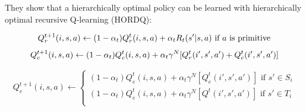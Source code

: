 They show that a hierarchically optimal policy can be learned with hierarchically optimal recursive Q-learning (HORDQ):

\begin{equation}
    Q_r^{t+1}(i, s, a) \leftarrow
    (1 - \alpha_t)Q_r^t(i, s, a) + \alpha_t R_t(s'| s, a)   \mbox{ if $a$ is primitive} \\
\end{equation}
\begin{equation}
    Q_c^{t+1}(i, s, a) \leftarrow
    (1 - \alpha_t)Q_c^t(i, s, a) + \alpha_t \gamma^N[Q_r^{t}(i', s', a') + Q_c^t(i', s', a')] \\
\end{equation}

\begin{equation}
    Q_e^{t+1}(i, s, a) \leftarrow
    \left\{\begin{array}{ll}
    (1 - \alpha_t)Q_e^{t}(i, s, a) + \alpha_t \gamma^N[Q_e^{t}(i', s', a')]  \mbox{ if $s' \in S_i$} \\
    (1 - \alpha_t)Q_e^{t}(i, s, a) + \alpha_t \gamma^N[Q^{t}(i', s', a')]  \mbox{ if $s' \in T_i$} \\
    \end{array} \right.
\end{equation}


